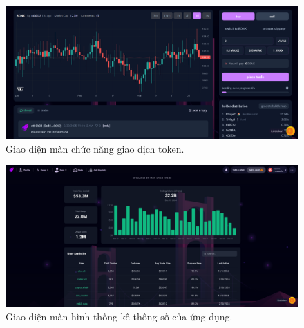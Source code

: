 \begin{figure}[H]
  \centering
  \includegraphics[width=1\textwidth]{figures/c3/TradeRel.png}
  \caption{Giao diện màn chức năng giao dịch token.}
  \label{fig:architecture-diagram}
\end{figure}

\begin{figure}[H]
  \centering
  \includegraphics[width=1\textwidth]{figures/c3/StatsRel.png}
  \caption{Giao diện màn hình thống kê thông số của ứng dụng.}
  \label{fig:architecture-diagram}
\end{figure}

